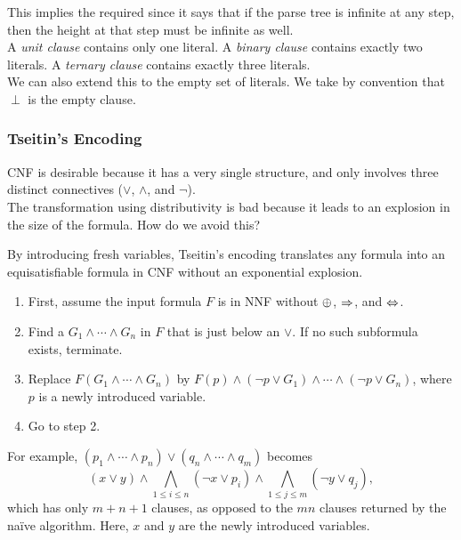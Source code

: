 This implies the required since it says that if the parse tree is infinite at any step, then the height at that step must be infinite as well.\\

A \textit{unit clause} contains only one literal. A \textit{binary clause} contains exactly two literals. A \textit{ternary clause} contains exactly three literals.\\
We can also extend this to the empty set of literals. We take by convention that $\perp$ is the empty clause.

\subsubsection{Tseitin's Encoding}

CNF is desirable because it has a very single structure, and only involves three distinct connectives ($\lor$, $\land$, and $\neg$).\\ The transformation using distributivity is bad because it leads to an explosion in the size of the formula. How do we avoid this?

By introducing fresh variables, Tseitin's encoding translates any formula into an equisatisfiable formula in CNF without an exponential explosion.

\begin{enumerate}
	\item First, assume the input formula $F$ is in NNF without $\oplus$, $\Rightarrow$, and $\Leftrightarrow$.
	\item Find a $G_1\land\cdots\land G_n$ in $F$ that is just below an $\lor$. If no such subformula exists, terminate.
	\item Replace $F(G_1\land\cdots\land G_n)$ by $F(p)\land(\neg p\lor G_1)\land\cdots\land(\neg p\lor G_n)$, where $p$ is a newly introduced variable.
	\item Go to step 2.
\end{enumerate}

For example, $(p_1\land\cdots\land p_n)\lor(q_n\land\cdots\land q_m)$ becomes
\[ (x\lor y) \land \bigwedge_{1\leq i\leq n} (\neg x\lor p_i) \land \bigwedge_{1\leq j\leq m} (\neg y \lor q_j), \]
which has only $m+n+1$ clauses, as opposed to the $mn$ clauses returned by the na\"{i}ve algorithm. Here, $x$ and $y$ are the newly introduced variables.\\

